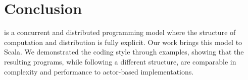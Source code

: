 \section{Conclusion}
\apgas is a concurrent and distributed programming model where the structure of
computation and distribution is fully explicit. Our work brings this model to
Scala. We demonstrated the coding style through examples, showing that the
resulting programs, while following a different structure, are comparable in
complexity and performance to actor-based implementations.
